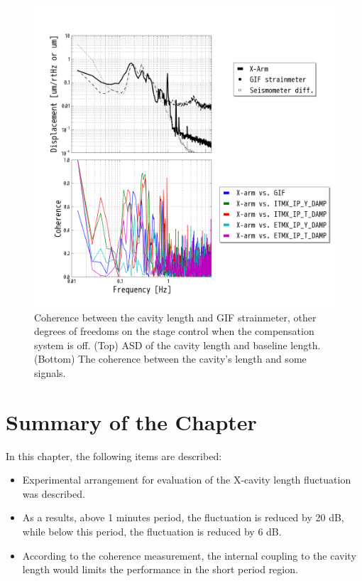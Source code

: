\begin{figure}[p]
    \centering 
    \includegraphics[width=15cm]{./img_chap6/img615.png}
    \caption{Coherence between the cavity length and GIF strainmeter, other degrees of freedoms on the stage control when the compensation system is off. (Top) ASD of the cavity length and baseline length. (Bottom) The coherence between the cavity's length and some signals.}\label{img:img615}
\end{figure}



\section{Summary of the Chapter} \label{sec:sec53}
In this chapter, the following items are described:
\begin{itemize}
\item Experimental arrangement for evaluation of the X-cavity length fluctuation was described.
\item As a results, above 1 minutes period, the fluctuation is reduced by 20 dB, while below this period, the fluctuation is reduced by 6 dB.
\item According to the coherence measurement, the internal coupling to the cavity length would limits the performance in the short period region.
\end{itemize}


